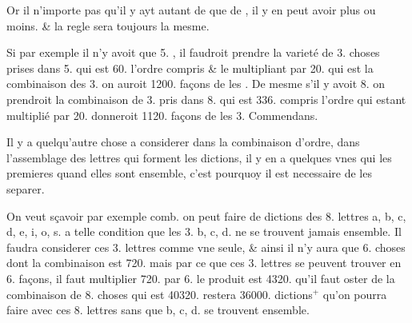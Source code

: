 \documentclass[11pt,a4paper]{article}
\begin{document}
Or il n'importe pas qu'il y ayt autant de   que de  , \add{*} il y en peut avoir plus ou moins. \& la regle sera toujours la mesme.

Si par exemple il n'y avoit que 5.  , il faudroit prendre la varieté de 3. choses prises dans 5. qui est 60. l'ordre compris  \& le multipliant par 20. qui est la combinaison des 3.   on auroit 1200. façons de les \struck{\ill{}} . De mesme s'il y avoit 8.   on prendroit la combinaison de 3. pris dans 8. qui est 336. compris l'ordre  qui estant  multiplié par 20. donneroit \struck{\ill{}} 1120. façons de \struck{\ill{}}  les 3.  Commendans.

Il y a quelqu'autre chose a considerer dans la combinaison d'ordre,  dans l'assemblage des lettres qui forment les dictions, il y en a quelques vnes qui \struck{\ill{}} \add{\ill{}} les premieres  quand elles sont ensemble, c'est pourquoy il est necessaire de les separer.

On veut sçavoir par exemple comb. on peut faire de dictions des 8. lettres a, b, c, d, e, i, o, s. a telle condition que les 3. b, c, d. ne se trouvent jamais ensemble.  Il faudra considerer ces 3. lettres comme vne seule, \& ainsi il n'y aura que 6. choses dont la combinaison est 720. mais par ce que ces 3. lettres se peuvent trouver   en 6. façons, il faut multiplier 720. par 6. le produit est 4320. qu'il faut oster de la combinaison de 8. choses qui est 40320. restera 36000. dictions${}^{+}$ qu'on pourra faire avec ces 8. lettres sans que b, c, d. se trouvent ensemble.
\end{document}
